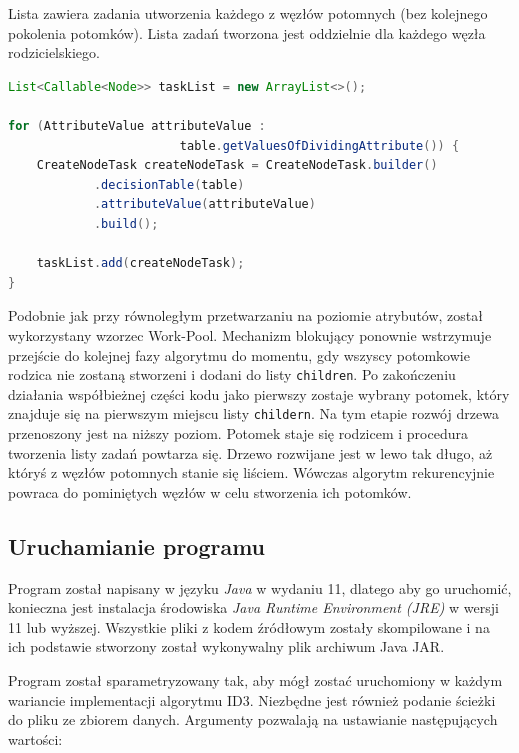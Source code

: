 \documentclass[12pt]{article}
\begin{document}
Lista zawiera zadania utworzenia każdego z węzłów potomnych (bez kolejnego pokolenia potomków). Lista zadań tworzona jest oddzielnie
dla każdego węzła rodzicielskiego.

\begin{lstlisting}[language=java, caption=Lista zadań równoległego tworzenia węzłów,frame=single,label={lst:create-node-parallel}]
List<Callable<Node>> taskList = new ArrayList<>();

for (AttributeValue attributeValue :
                        table.getValuesOfDividingAttribute()) {
    CreateNodeTask createNodeTask = CreateNodeTask.builder()
            .decisionTable(table)
            .attributeValue(attributeValue)
            .build();

    taskList.add(createNodeTask);
}
\end{lstlisting}

Podobnie jak przy równoległym przetwarzaniu na poziomie atrybutów, został wykorzystany wzorzec Work-Pool.
Mechanizm blokujący ponownie wstrzymuje przejście do kolejnej fazy algorytmu do momentu, gdy wszyscy potomkowie rodzica nie zostaną stworzeni
i dodani do listy \verb|children|. Po zakończeniu działania współbieżnej części kodu jako pierwszy zostaje wybrany potomek, który znajduje się
na pierwszym miejscu listy \verb|childern|. Na tym etapie rozwój drzewa przenoszony jest na niższy poziom. Potomek staje się rodzicem
i procedura tworzenia listy zadań powtarza się. Drzewo rozwijane jest w lewo tak długo, aż któryś z węzłów potomnych stanie się liściem.
Wówczas algorytm rekurencyjnie powraca do pominiętych węzłów w celu stworzenia ich potomków.

\subsection{Uruchamianie programu}

Program został napisany w języku \textit{Java} w wydaniu 11, dlatego aby go uruchomić, konieczna jest instalacja środowiska \textit{Java Runtime Environment (JRE)}
w wersji 11 lub wyższej. Wszystkie pliki z kodem źródłowym zostały skompilowane i na ich podstawie stworzony został wykonywalny plik archiwum Java JAR.

Program został sparametryzowany tak, aby mógł zostać uruchomiony w każdym wariancie implementacji algorytmu ID3. Niezbędne jest również
podanie ścieżki do pliku ze zbiorem danych. Argumenty pozwalają na ustawianie następujących wartości:
\end{document}
